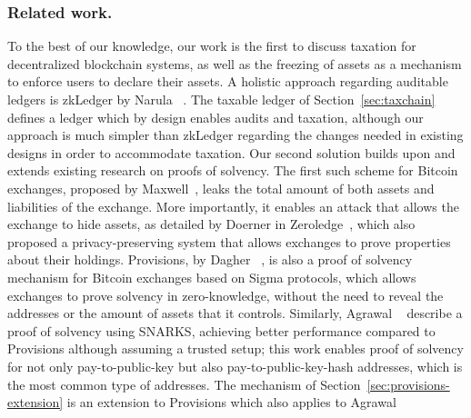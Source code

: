 \subsubsection{Related work.}\label{sec:related}

To the best of our knowledge, our work is the first to discuss taxation for
decentralized blockchain systems, as well as the freezing of assets as a
mechanism to enforce users to declare their assets. A holistic approach
regarding auditable ledgers is zkLedger by Narula
\etal~\cite{EPRINT:NarVasVir18}. The taxable ledger of
Section~\ref{sec:taxchain} defines a ledger which by design enables audits and
taxation, although our approach is much simpler than zkLedger regarding the
changes needed in existing designs in order to accommodate taxation.  Our
second solution builds upon and extends existing research on proofs of
solvency. The first such scheme for Bitcoin exchanges, proposed by
Maxwell~\cite{wilcox2014proving}, leaks the total amount of both assets and
liabilities of the exchange. More importantly, it enables an attack that allows
the exchange to hide assets, as detailed by Doerner \etal in
Zeroledge~\cite{doernerzeroledge}, which also proposed a privacy-preserving
system that allows exchanges to prove properties about their holdings.
Provisions, by Dagher \etal~\cite{CCS:DBBCB15}, is also a proof of solvency
mechanism for Bitcoin exchanges based on Sigma protocols, which allows
exchanges to prove solvency in zero-knowledge, \ie without the need to reveal
the addresses or the amount of assets that it controls. Similarly, Agrawal
\etal~\cite{C:AgrGanMoh18} describe a proof of solvency using SNARKS, achieving
better performance compared to Provisions although assuming a trusted setup;
this work enables proof of solvency for not only pay-to-public-key but also
pay-to-public-key-hash addresses, which is the most common type of addresses.
The mechanism of Section~\ref{sec:provisions-extension} is an extension to
Provisions which also applies to Agrawal \etal

